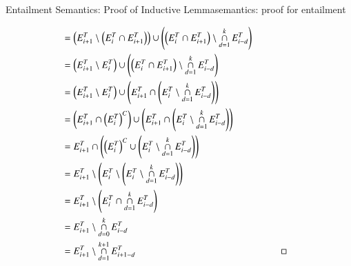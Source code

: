 \begin{nestedappendix}{Entailment Semantics: Proof of Inductive Lemma}{semantics: proof for entailment}
\begin{figure*}
\begin{align*}
			& = \left( E^T_{i+1} \setminus \left( E^T_{i} \cap E^T_{i+1} \right) \right) \cup \left( \left( E^T_{i} \cap E^T_{i+1} \right) \setminus \mathop{\cap}^{k}_{d=1} E^T_{i-d} \right) \\
			& = \left( E^T_{i+1} \setminus E^T_{i} \right) \cup \left( \left( E^T_{i} \cap E^T_{i+1} \right) \setminus \mathop{\cap}^{k}_{d=1} E^T_{i-d} \right) \\
			& = \left( E^T_{i+1} \setminus E^T_{i} \right) \cup \left( E^T_{i+1} \cap \left( E^T_{i} \setminus \mathop{\cap}^{k}_{d=1} E^T_{i-d} \right) \right) \\
			& = \left( E^T_{i+1} \cap \left( E^T_{i} \right)^C \right) \cup \left( E^T_{i+1} \cap \left( E^T_{i} \setminus \mathop{\cap}^{k}_{d=1} E^T_{i-d} \right) \right)\\
			& = E^T_{i+1} \cap \left( \left( E^T_{i} \right)^C \cup \left( E^T_{i} \setminus \mathop{\cap}^{k}_{d=1} E^T_{i-d} \right) \right) \\
			& = E^T_{i+1} \setminus \left( E^T_{i} \setminus \left( E^T_{i} \setminus \mathop{\cap}^{k}_{d=1} E^T_{i-d} \right) \right) \\
			& = E^T_{i+1} \setminus \left( E^T_{i} \cap \mathop{\cap}^{k}_{d=1} E^T_{i-d} \right) \\
			& = E^T_{i+1} \setminus \mathop{\cap}^{k}_{d=0} E^T_{i-d} \\
			& = E^T_{i+1} \setminus \mathop{\cap}^{k+1}_{d=1} E^T_{i+1-d} && \qedhere
		\end{align*}
	\end{figure*}
\end{nestedappendix}